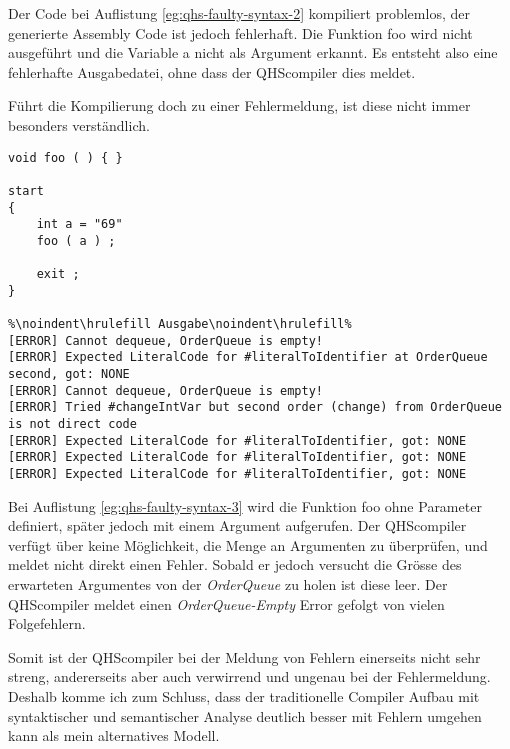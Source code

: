 Der Code bei Auflistung \ref{eg:qhs-faulty-syntax-2} kompiliert problemlos, der generierte Assembly Code ist jedoch fehlerhaft. Die Funktion foo wird nicht ausgeführt und die Variable a nicht als Argument erkannt.
Es entsteht also eine fehlerhafte Ausgabedatei, ohne dass der QHScompiler dies meldet.

Führt die Kompilierung doch zu einer Fehlermeldung, ist diese nicht immer besonders verständlich.

\begin{lstlisting}[language=QHS, caption=QHS mit falscher Anzahl Argumente, label=eg:qhs-faulty-syntax-3]
void foo ( ) { }

start
{
    int a = "69" 
    foo ( a ) ;

    exit ;
}

%\noindent\hrulefill Ausgabe\noindent\hrulefill%
[ERROR] Cannot dequeue, OrderQueue is empty!
[ERROR] Expected LiteralCode for #literalToIdentifier at OrderQueue second, got: NONE
[ERROR] Cannot dequeue, OrderQueue is empty!
[ERROR] Tried #changeIntVar but second order (change) from OrderQueue is not direct code
[ERROR] Expected LiteralCode for #literalToIdentifier, got: NONE
[ERROR] Expected LiteralCode for #literalToIdentifier, got: NONE
[ERROR] Expected LiteralCode for #literalToIdentifier, got: NONE
\end{lstlisting}

Bei Auflistung \ref{eg:qhs-faulty-syntax-3} wird die Funktion foo ohne Parameter definiert, später jedoch mit einem Argument aufgerufen.
Der QHScompiler verfügt über keine Möglichkeit, die Menge an Argumenten zu überprüfen, und meldet nicht direkt einen Fehler. 
Sobald er jedoch versucht die Grösse des erwarteten Argumentes von der \textit{OrderQueue} zu holen ist diese leer.
Der QHScompiler meldet einen \textit{OrderQueue-Empty} Error gefolgt von vielen Folgefehlern.


Somit ist der QHScompiler bei der Meldung von Fehlern einerseits nicht sehr streng, andererseits aber auch verwirrend und ungenau bei der Fehlermeldung.
Deshalb komme ich zum Schluss, dass der traditionelle Compiler Aufbau mit syntaktischer und semantischer Analyse deutlich besser mit Fehlern umgehen kann als mein alternatives Modell.

